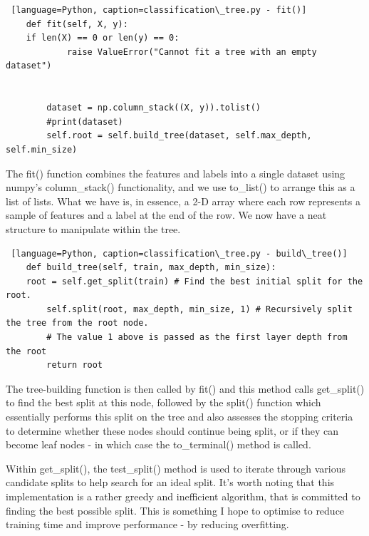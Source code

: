 \documentclass[letterpaper,10pt]{article}
\begin{document}
\begin{lstlisting} [language=Python, caption=classification\_tree.py - fit()]
    def fit(self, X, y):
    if len(X) == 0 or len(y) == 0:
            raise ValueError("Cannot fit a tree with an empty dataset")


        dataset = np.column_stack((X, y)).tolist()
        #print(dataset)
        self.root = self.build_tree(dataset, self.max_depth, self.min_size)
\end{lstlisting}

The fit() function combines the features and labels into a single dataset using numpy's column\_stack() functionality, and we use to\_list() to arrange this as a list of lists. What we have is, in essence, a 2-D array where each row represents a sample of features and a label at the end of the row. We now have a neat structure to manipulate within the tree. \par

\begin{lstlisting} [language=Python, caption=classification\_tree.py - build\_tree()]
    def build_tree(self, train, max_depth, min_size):
    root = self.get_split(train) # Find the best initial split for the root.
        self.split(root, max_depth, min_size, 1) # Recursively split the tree from the root node.
        # The value 1 above is passed as the first layer depth from the root
        return root
\end{lstlisting}

The tree-building function is then called by fit() and this method calls get\_split() to find the best split at this node, followed by the split() function which essentially performs this split on the tree and also assesses the stopping criteria to determine whether these nodes should continue being split, or if they can become leaf nodes - in which case the to\_terminal() method is called. \par
Within get\_split(), the test\_split() method is used to iterate through various candidate splits to help search for an ideal split. It's worth noting that this implementation is a rather greedy and inefficient algorithm, that is committed to finding the best possible split. This is something I hope to optimise to reduce training time and improve performance - by reducing overfitting. \par
\end{document}
